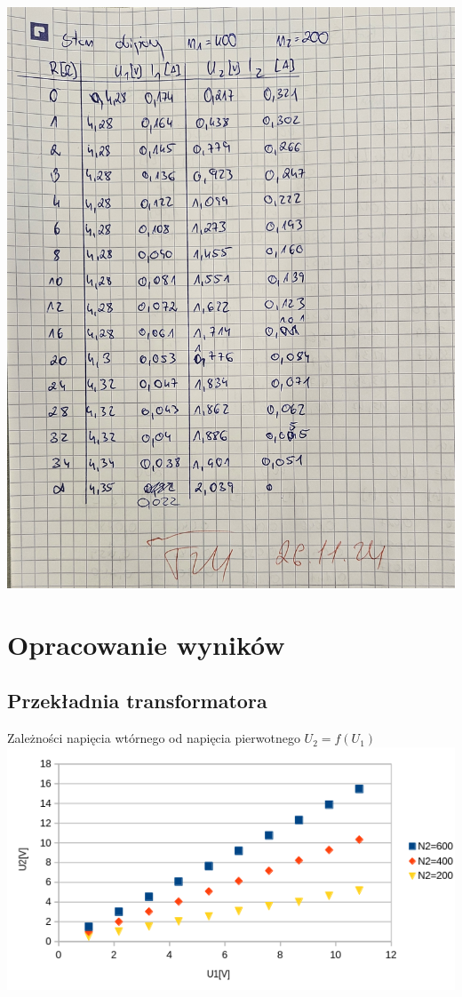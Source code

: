 \documentclass[a4paper, 11pt]{article}
\begin{document}
\includegraphics[scale=0.2]{images/img2.jpg}
\pagebreak

\section{Opracowanie wyników}\label{sec:opracowanie_wynikow} %

\subsection{Przekładnia transformatora}\label{sub:przekladnia} %
\begin{center}
	\large Zależności napięcia wtórnego od napięcia pierwotnego
	$U_2 = f(U_1)$
	\includegraphics[scale=0.8]{images/1.png}
\end{center}
\end{document}
